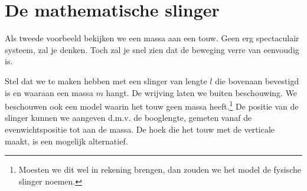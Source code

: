 \documentclass{ximera}
\begin{document}
	\author{Bart Lambregs}
    \xmsource





	\section{De mathematische slinger}

	Als tweede voorbeeld bekijken we een massa aan een touw. Geen erg spectaculair systeem, zal je denken. Toch zal je snel zien dat de beweging verre van eenvoudig is.
	
	Stel dat we te maken hebben met een slinger van lengte $l$ die bovenaan bevestigd is en waaraan een massa $m$ hangt. De wrijving laten we buiten beschouwing. We beschouwen ook een model waarin het touw geen massa heeft.\footnote{Moesten we dit wel in rekening brengen, dan zouden we het model de fysische slinger noemen.} De positie van de slinger kunnen we aangeven d.m.v. de booglengte, gemeten vanaf de evenwichtspositie tot aan de massa. De hoek die het touw met de verticale maakt, is een mogelijk alternatief. 
	
\end{document}

